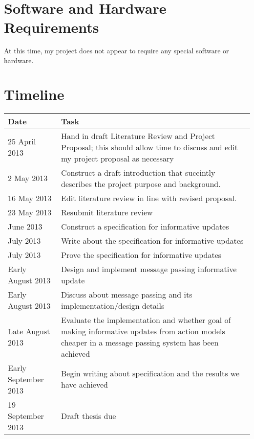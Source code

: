 \documentclass[12pt, a4paper]{article}
\begin{document}
\section*{Software and Hardware Requirements}
At this time, my project does not appear to require any special software or hardware.

\section*{Timeline}

\begin{center}
	\begin{tabular}{ | l | p{10cm} |}
		\hline
		Date & Task \\
		\hline
		25 April 2013 & Hand in draft Literature Review and Project Proposal;
    this should allow time to discuss and edit my project proposal as necessary\\
		\hline
		2 May 2013 & Construct a draft introduction that succintly describes the project purpose and background.\\
		\hline
		16 May 2013 & Edit literature review in line with revised proposal.\\
		\hline
		23 May 2013 & Resubmit literature review \\
		\hline
		June 2013 & Construct a specification for informative updates \\
		\hline
		July 2013 & Write about the specification for informative updates \\
		\hline
		July 2013 & Prove the specification for informative updates \\
		\hline
		Early August 2013 & Design and implement message passing informative update \\
		\hline
		Early August 2013 & Discuss about message passing and its implementation/design details \\
		\hline
		Late August 2013 & Evaluate the implementation and whether goal of making informative updates from action models cheaper in a message passing system has been achieved\\
		\hline
		Early September 2013 & Begin writing about specification and the results we have achieved \\
		\hline
		19 September 2013 & Draft thesis due \\
		\hline
	\end{tabular}
\end{center}
\end{document}
